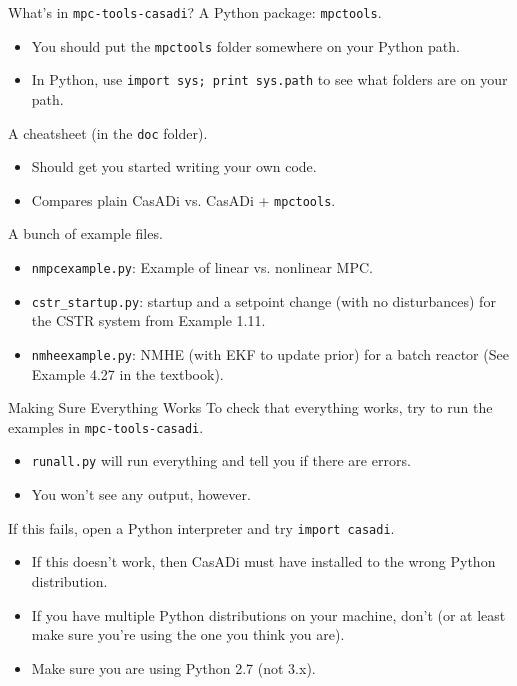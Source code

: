 \documentclass[xcolor=dvipsnames]{beamer}
\begin{document}
\begin{frame}{What's in \texttt{mpc-tools-casadi}?}
    A Python package: \texttt{mpctools}.
    \begin{itemize}
        \item You should put the \texttt{mpctools} folder somewhere on your Python path.
        \item In Python, use \lstinline[style=python]!import sys; print sys.path! to see what folders are on your path.
    \end{itemize}
    
    \medskip
    
    A cheatsheet (in the \texttt{doc} folder).
    \begin{itemize}
        \item Should get you started writing your own code.
        \item Compares plain CasADi vs. CasADi + \texttt{mpctools}.
    \end{itemize}
    
    \medskip
    
    A bunch of example files.
    \begin{itemize}
        \item \texttt{nmpcexample.py}: Example of linear vs. nonlinear MPC.
        \item \texttt{cstr\_startup.py}: startup and a setpoint change (with no disturbances) for the CSTR system from Example 1.11.
        \item \texttt{nmheexample.py}: NMHE (with EKF to update prior) for a batch reactor (See Example 4.27 in the textbook).
    \end{itemize}
\end{frame}

\begin{frame}{Making Sure Everything Works}
    To check that everything works, try to run the examples in \texttt{mpc-tools-casadi}.
    \begin{itemize}
        \item \texttt{runall.py} will run everything and tell you if there are errors.
        \item You won't see any output, however.
    \end{itemize}
    
    \medskip
    
    If this fails, open a Python interpreter and try \texttt{import casadi}.
    \begin{itemize}
        \item If this doesn't work, then CasADi must have installed to the wrong Python distribution.
        \item If you have multiple Python distributions on your machine, don't (or at least make sure you're using the one you think you are).
        \item Make sure you are using Python 2.7 (not 3.x).
    \end{itemize}
\end{frame}
\end{document}
